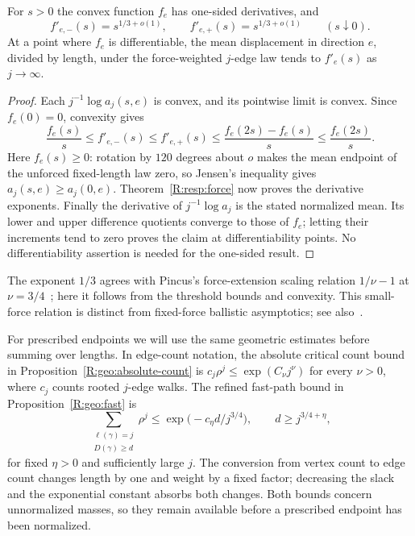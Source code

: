 \begin{corollary}\label{R:resp:force-derivatives}
For $s>0$ the convex function $f_e$ has one-sided derivatives, and
\[
 f'_{e,-}(s)=s^{1/3+o(1)},\qquad f'_{e,+}(s)=s^{1/3+o(1)}
 \qquad(s\downarrow0).
\]
At a point where $f_e$ is differentiable, the mean displacement in direction $e$, divided by length, under the force-weighted $j$-edge law tends to $f'_e(s)$ as $j\to\infty$.
\end{corollary}
\begin{proof}
Each $j^{-1}\log a_j(s,e)$ is convex, and its pointwise limit is convex. Since $f_e(0)=0$, convexity gives
\[
 \frac{f_e(s)}s\le f'_{e,-}(s)\le f'_{e,+}(s)
       \le\frac{f_e(2s)-f_e(s)}s\le\frac{f_e(2s)}s.
\]
Here $f_e(s)\ge0$: rotation by $120$ degrees about $o$ makes the mean endpoint of the unforced fixed-length law zero, so Jensen's inequality gives $a_j(s,e)\ge a_j(0,e)$. Theorem~\ref{R:resp:force} now proves the derivative exponents. Finally the derivative of $j^{-1}\log a_j$ is the stated normalized mean. Its lower and upper difference quotients converge to those of $f_e$; letting their increments tend to zero proves the claim at differentiability points. No differentiability assertion is needed for the one-sided result.
\end{proof}

The exponent $1/3$ agrees with Pincus's force-extension scaling relation $1/\nu-1$ at $\nu=3/4$~\cite[Eq.~(I.4)]{Pincus1976}; here it follows from the threshold bounds and convexity. This small-force relation is distinct from fixed-force ballistic asymptotics; see also~\cite[Section~4.2.3]{IoffeVelenik2010}.

For prescribed endpoints we will use the same geometric estimates before summing over lengths. In edge-count notation, the absolute critical count bound in Proposition~\ref{R:geo:absolute-count} is
$c_j\rho^j\le\exp(C_\nu j^\nu)$ for every $\nu>0$, where $c_j$ counts rooted $j$-edge walks. The refined fast-path bound in Proposition~\ref{R:geo:fast} is
\begin{equation}
 \sum_{\substack{\ell(\gamma)=j\\D(\gamma)\ge d}}\rho^j
       \le\exp\bigl(-c_\eta d/j^{3/4}\bigr),
 \qquad d\ge j^{3/4+\eta},
 \label{R:resp:refined-fast}
\end{equation}
for fixed $\eta>0$ and sufficiently large $j$. The conversion from vertex count to edge count changes length by one and weight by a fixed factor; decreasing the slack and the exponential constant absorbs both changes. Both bounds concern unnormalized masses, so they remain available before a prescribed endpoint has been normalized.

